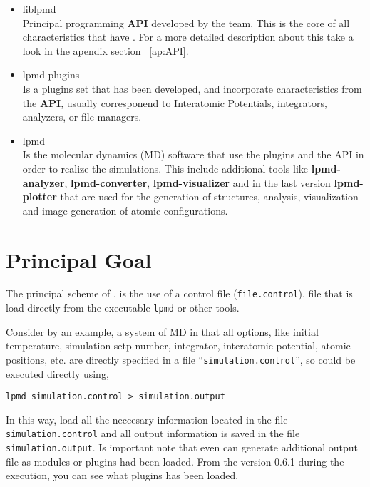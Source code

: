 \begin{itemize}
 \item liblpmd \\
Principal programming \textbf{API} developed by the team. This is
the core of all characteristics that have {\lpmd}. For a more detailed
description about this take a look in the apendix section ~\ref{ap:API}.
 \item lpmd-plugins \\
Is a plugins set that has been developed, and incorporate characteristics from
the \textbf{API}, usually corresponend to Interatomic Potentials,
integrators, analyzers, or file managers.
 \item lpmd \\
{\lpmd} Is the molecular dynamics (MD) software that use the plugins and the
API in order to realize the simulations. This include additional tools
like \textbf{lpmd-analyzer}, \textbf{lpmd-converter}, \textbf{lpmd-visualizer}
and in the last version \textbf{lpmd-plotter} that are used for the generation
of structures, analysis, visualization and image generation of atomic
configurations.
\end{itemize}

\section{Principal Goal}

The principal scheme of {\lpmd}, is the use of a control file
(\verb|file.control|), file that is load directly from the executable
\verb|lpmd| or other tools.

Consider by an example, a system of MD in that all options, like initial
temperature, simulation setp number, integrator, interatomic potential, atomic
positions, etc. are directly specified in a file ``\verb|simulation.control|'',
so {\lpmd} could be executed directly using, 

\begin{center}
 \texttt{lpmd simulation.control > simulation.output}
\end{center}
\noindent

In this way, {\lpmd} load all the neccesary information located in the file
\verb|simulation.control| and all output information is saved in the file
\verb|simulation.output|. Is important note that {\lpmd} even can generate
additional output file as modules or plugins had been loaded. From the version
0.6.1 during the {\lpmd} execution, you can see what plugins has been loaded.

